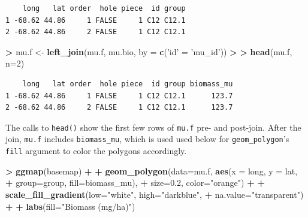 \documentclass[]{krantz}
\makeatletter
\newenvironment{Shaded}{\begin{snugshade}}{\end{snugshade}}
\newcommand{\KeywordTok}[1]{\textcolor[rgb]{0.27,0.27,0.27}{\textbf{#1}}}
\newcommand{\DataTypeTok}[1]{\textcolor[rgb]{0.27,0.27,0.27}{#1}}
\newcommand{\DecValTok}[1]{\textcolor[rgb]{0.06,0.06,0.06}{#1}}
\newcommand{\FloatTok}[1]{\textcolor[rgb]{0.06,0.06,0.06}{#1}}
\newcommand{\StringTok}[1]{\textcolor[rgb]{0.5,0.5,0.5}{#1}}
\newcommand{\OperatorTok}[1]{\textcolor[rgb]{0.43,0.43,0.43}{\textbf{#1}}}
\newcommand{\ErrorTok}[1]{\textcolor[rgb]{0.14,0.14,0.14}{\textbf{#1}}}
\newcommand{\NormalTok}[1]{#1}
\newenvironment{kframe}{%
\medskip{}
\setlength{\fboxsep}{.8em}
 \def\at@end@of@kframe{}%
 \ifinner\ifhmode%
  \def\at@end@of@kframe{\end{minipage}}%
  \begin{minipage}{\columnwidth}%
 \fi\fi%
 \def\FrameCommand##1{\hskip\@totalleftmargin \hskip-\fboxsep
 \colorbox{shadecolor}{##1}\hskip-\fboxsep
     \hskip-\linewidth \hskip-\@totalleftmargin \hskip\columnwidth}%
 \MakeFramed {\advance\hsize-\width
   \@totalleftmargin\z@ \linewidth\hsize
   \@setminipage}}%
 {\par\unskip\endMakeFramed%
 \at@end@of@kframe}
\renewenvironment{Shaded}{\begin{kframe}}{\end{kframe}}
\makeatother
\begin{document}
\begin{verbatim}
    long   lat order  hole piece  id group
1 -68.62 44.86     1 FALSE     1 C12 C12.1
2 -68.62 44.86     2 FALSE     1 C12 C12.1
\end{verbatim}

\begin{Shaded}
\begin{Highlighting}[]
\OperatorTok{>}\StringTok{ }\NormalTok{mu.f <-}\StringTok{ }\KeywordTok{left_join}\NormalTok{(mu.f, mu.bio, }\DataTypeTok{by =} \KeywordTok{c}\NormalTok{(}\StringTok{'id'}\NormalTok{ =}\StringTok{ 'mu_id'}\NormalTok{))}
\OperatorTok{>}\StringTok{ }
\ErrorTok{>}\StringTok{ }\KeywordTok{head}\NormalTok{(mu.f, }\DataTypeTok{n=}\DecValTok{2}\NormalTok{)}
\end{Highlighting}
\end{Shaded}

\begin{verbatim}
    long   lat order  hole piece  id group biomass_mu
1 -68.62 44.86     1 FALSE     1 C12 C12.1      123.7
2 -68.62 44.86     2 FALSE     1 C12 C12.1      123.7
\end{verbatim}

The calls to \texttt{head()} show the first few rows of \texttt{mu.f}
pre- and post-join. After the join, \texttt{mu.f} includes
\texttt{biomass\_mu}, which is used used below for
\texttt{geom\_polygon}'s \texttt{fill} argument to color the polygons
accordingly.

\begin{Shaded}
\begin{Highlighting}[]
\OperatorTok{>}\StringTok{ }\KeywordTok{ggmap}\NormalTok{(basemap) }\OperatorTok{+}
\OperatorTok{+}\StringTok{     }\KeywordTok{geom_polygon}\NormalTok{(}\DataTypeTok{data=}\NormalTok{mu.f, }\KeywordTok{aes}\NormalTok{(}\DataTypeTok{x =}\NormalTok{ long, }\DataTypeTok{y =}\NormalTok{ lat, }
\OperatorTok{+}\StringTok{                                 }\DataTypeTok{group=}\NormalTok{group, }\DataTypeTok{fill=}\NormalTok{biomass_mu), }
\OperatorTok{+}\StringTok{                  }\DataTypeTok{size=}\FloatTok{0.2}\NormalTok{, }\DataTypeTok{color=}\StringTok{"orange"}\NormalTok{) }\OperatorTok{+}
\OperatorTok{+}\StringTok{     }\KeywordTok{scale_fill_gradient}\NormalTok{(}\DataTypeTok{low=}\StringTok{"white"}\NormalTok{, }\DataTypeTok{high=}\StringTok{"darkblue"}\NormalTok{, }
\OperatorTok{+}\StringTok{                         }\DataTypeTok{na.value=}\StringTok{"transparent"}\NormalTok{) }\OperatorTok{+}
\OperatorTok{+}\StringTok{     }\KeywordTok{labs}\NormalTok{(}\DataTypeTok{fill=}\StringTok{"Biomass (mg/ha)"}\NormalTok{)}
\end{Highlighting}
\end{Shaded}
\end{document}
